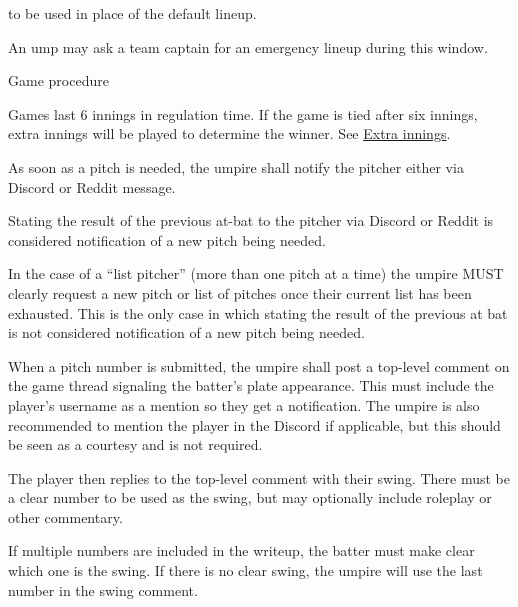 \begin{deepEnumerate}
\begin{deepEnumerate}
\begin{deepEnumerate}
\begin{deepEnumerate}
				to be used in place of the default lineup.
				\begin{deepEnumerate}
					\item An ump may ask a team captain for an emergency lineup during this window.
				\end{deepEnumerate}
			\end{deepEnumerate}
		\end{deepEnumerate}
	\end{deepEnumerate}
	\item Game procedure
	\begin{deepEnumerate}
		\item Games last 6 innings in regulation time. 
		If the game is tied after six innings, extra innings will be played to determine the winner. 
		See \hyperref[sec:extra innings]{Extra innings}.
		\item As soon as a pitch is needed, the umpire shall notify the pitcher either via Discord or Reddit message.
		\begin{deepEnumerate}
			\item Stating the result of the previous at-bat to the pitcher via Discord or Reddit is considered notification of a new 
			pitch being needed.
			\item  In the case of a “list pitcher” (more than one pitch at a time) the umpire MUST clearly request a new pitch or list
			 of pitches once their current list has been exhausted. This is the only case in which stating the result of the previous
			 at bat is not considered notification of a new pitch being needed.
		\end{deepEnumerate}
		\item When a pitch number is submitted, 
		the umpire shall post a top-level comment on the game thread signaling the batter's plate appearance. 
		This must include the player's username as a mention so they get a notification. 
		The umpire is also recommended to mention the player in the Discord if applicable, 
		but this should be seen as a courtesy and is not required.
		\item The player then replies to the top-level comment with their swing. 
		There must be a clear number to be used as the swing, but may optionally include roleplay or other commentary.
		\begin{deepEnumerate}
			\item If multiple numbers are included in the writeup, the batter must make clear which one is the swing. 
			If there is no clear swing, the umpire will use the last number in the swing comment. 

\end{deepEnumerate}
\end{deepEnumerate}
\end{deepEnumerate}
